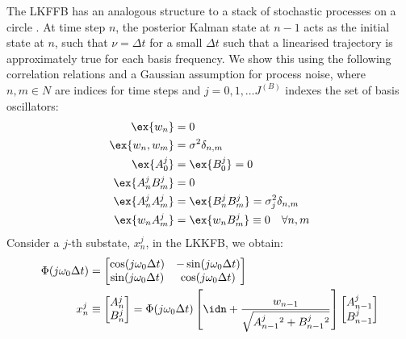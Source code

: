 The LKFFB has an analogous structure to a stack of stochastic processes on a circle \cite{karlin1975first}. At time step $n$,  the posterior Kalman state at $n-1$ acts as the initial state at $n$, such that $\nu = \Delta t$ for a small $\Delta t$ such that a linearised trajectory is approximately true for each basis frequency. We show this using the following correlation relations and a Gaussian assumption for process noise, where $n,m \in N$ are indices for time steps and $j = 0, 1, \hdots J^{(B)} $ indexes the set of basis oscillators:
 \begin{align}
 \ex{w_n} &= 0 \\
\ex{w_n,w_m} &= \sigma^2 \delta_{n,m}  \\
\ex{A^j_0} &=\ex{B^j_0} = 0 \\
\ex{A^j_n B^j_m} &= 0 \\
\ex{A^j_n A^j_m} &= \ex{B^j_n B^j_m} = \sigma_j^2 \delta_{n,m} \\
\ex{w_n A^j_m} &= \ex{w_n B^j_m} \equiv 0 \quad  \forall n, m \\
\end{align}
Consider a $j$-th substate, $x^j_n$, in the LKKFB, we obtain:
\begin{align}
\Phi(j \omega_0 \Delta t) &= \begin{bmatrix} \cos(j \omega_0 \Delta t) & -\sin(j \omega_0 \Delta t) \\ \sin(j \omega_0 \Delta t) & \cos(j \omega_0 \Delta t) \\ \end{bmatrix} \\
x^j_n & \equiv \begin{bmatrix} A^j_{n} \\ B^j_{n} \\ \end{bmatrix} = \Phi(j \omega_0 \Delta t) \left[\idn + \frac{w_{n-1}}{\sqrt{A^j_{n-1}{}^2 + B^j_{n-1}{}^2}} \right] \begin{bmatrix} A^j_{n-1} \\ B^j_{n-1} \\ \end{bmatrix} \\
\end{align}
